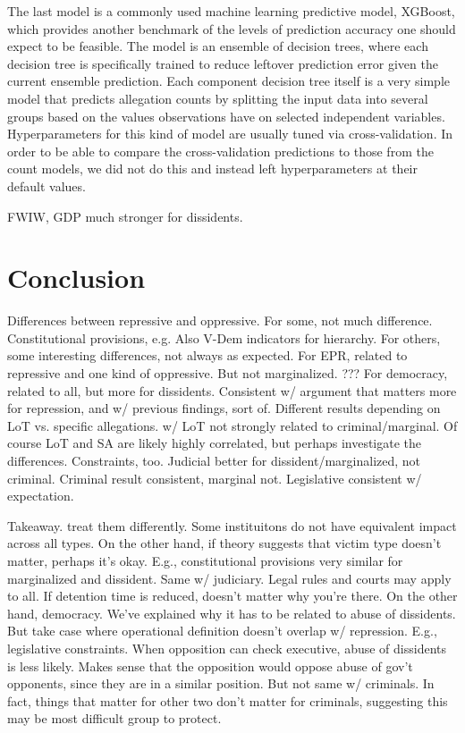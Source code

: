 \documentclass[11pt]{article}
\begin{document}
The last model is a commonly used machine learning predictive model, XGBoost, which provides another benchmark of the levels of prediction accuracy one should expect to be feasible. The model is an ensemble of decision trees, where each decision tree is specifically trained to reduce leftover prediction error given the current ensemble prediction. Each component decision tree itself is a very simple model that predicts allegation counts by splitting the input data into several groups based on the values observations have on selected independent variables. Hyperparameters for this kind of model are usually tuned via cross-validation. In order to be able to compare the cross-validation predictions to those from the count models, we did not do this and instead left hyperparameters at their default values.

FWIW, GDP much stronger for dissidents. 

\section*{Conclusion}

Differences between repressive and oppressive. For some, not much difference. Constitutional provisions, e.g. Also V-Dem indicators for hierarchy. For others, some interesting differences, not always as expected. For EPR, related to repressive and one kind of oppressive. But not marginalized. ??? For democracy, related to all, but more for dissidents. Consistent w/ argument that matters more for repression, and w/ previous findings, sort of. Different results depending on LoT vs. specific allegations. w/ LoT not strongly related to criminal/marginal. Of course LoT and SA are likely highly correlated, but perhaps investigate the differences. Constraints, too. Judicial better for dissident/marginalized, not criminal. Criminal result consistent, marginal not. Legislative consistent w/ expectation. 

Takeaway. treat them differently. Some instituitons do not have equivalent impact across all types. On the other hand, if theory suggests that victim type doesn't matter, perhaps it's okay. E.g., constitutional provisions very similar for marginalized and dissident. Same w/ judiciary. Legal rules and courts may apply to all. If detention time is reduced, doesn't matter why you're there. On the other hand, democracy. We've explained why it has to be related to abuse of dissidents. But take case where operational definition doesn't overlap w/ repression. E.g., legislative constraints. When opposition can check executive, abuse of dissidents is less likely. Makes sense that the opposition would oppose abuse of gov't opponents, since they are in a similar position. But not same w/ criminals. In fact, things that matter for other two don't matter for criminals, suggesting this may be most difficult group to protect.   

\clearpage
\begin{singlespace}


\end{singlespace}
\end{document}
